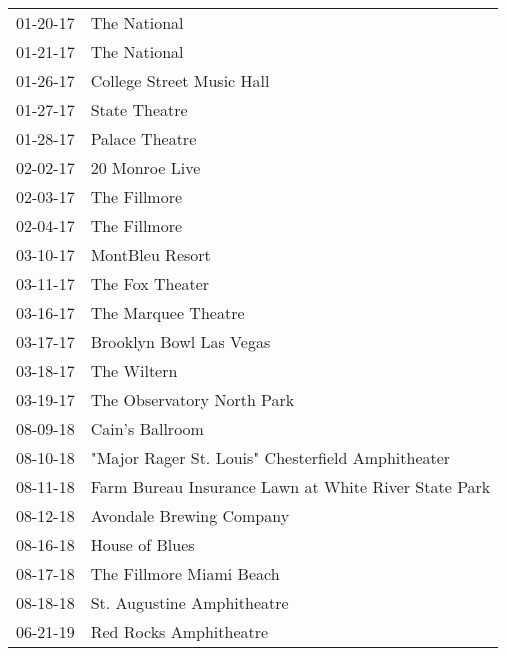 \begin{supertabular}{p{0.25\columnwidth}p{0.75\columnwidth}}
 01-20-17 &                                          The National \\
 01-21-17 &                                          The National \\
 01-26-17 &                             College Street Music Hall \\
 01-27-17 &                                         State Theatre \\
 01-28-17 &                                        Palace Theatre \\
 02-02-17 &                                        20 Monroe Live \\
 02-03-17 &                                          The Fillmore \\
 02-04-17 &                                          The Fillmore \\
 03-10-17 &                                       MontBleu Resort \\
 03-11-17 &                                       The Fox Theater \\
 03-16-17 &                                   The Marquee Theatre \\
 03-17-17 &                               Brooklyn Bowl Las Vegas \\
 03-18-17 &                                           The Wiltern \\
 03-19-17 &                            The Observatory North Park \\
 08-09-18 &                                       Cain's Ballroom \\
 08-10-18 &     "Major Rager St. Louis" Chesterfield Amphitheater \\
 08-11-18 &  Farm Bureau Insurance Lawn at White River State Park \\
 08-12-18 &                              Avondale Brewing Company \\
 08-16-18 &                                        House of Blues \\
 08-17-18 &                              The Fillmore Miami Beach \\
 08-18-18 &                            St. Augustine Amphitheatre \\
 06-21-19 &                                Red Rocks Amphitheatre \\
\end{supertabular}
